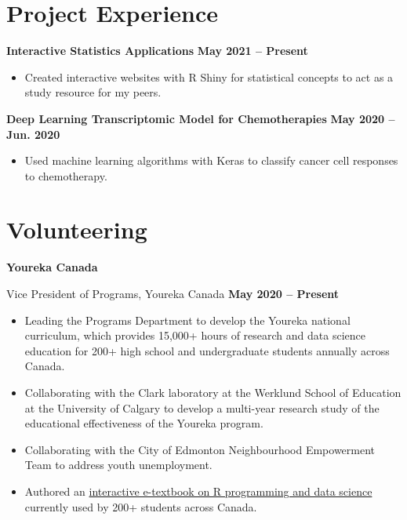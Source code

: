 \documentclass{article}
\begin{document}
\section*{\textcolor{my_colour}{Project Experience}}
\vspace{-.25em} \hrulefill \vspace{.75em}

\textbf{Interactive Statistics Applications} \hfill \textbf{May 2021 -- Present}
\begin{itemize}
    \item Created interactive websites with R Shiny for statistical concepts to act as a study resource for my peers.
\end{itemize}

\textbf{Deep Learning Transcriptomic Model for Chemotherapies} \hfill \textbf{May 2020 -- Jun. 2020}
\begin{itemize}
    \item Used machine learning algorithms with Keras to classify cancer cell responses to chemotherapy.
\end{itemize}


\section*{\textcolor{my_colour}{Volunteering}}
\vspace{-.25em} \hrulefill \vspace{.75em}

\textbf{Youreka Canada}

Vice President of Programs, Youreka Canada \hfill \textbf{May 2020 -- Present}
\begin{itemize}
    \item Leading the Programs Department to develop the Youreka national curriculum, which provides 15,000+ hours of research and data science education for 200+ high school and undergraduate students annually across Canada.
    \item Collaborating with the Clark laboratory at the Werklund School of Education at the University of Calgary to develop a multi-year research study of the educational effectiveness of the Youreka program.
    \item Collaborating with the City of Edmonton Neighbourhood Empowerment Team to address youth unemployment.
    \item Authored an \href{https://youreka-textbook.netlify.app/}{interactive e-textbook on R programming and data science} currently used by 200+ students across Canada.
\end{itemize}
\end{document}
